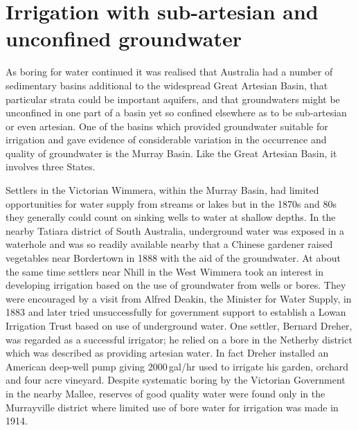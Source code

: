 \section*{Irrigation with sub-artesian and unconfined groundwater}

As boring for water continued it was realised that Australia had a
number of sedimentary basins additional to the widespread Great
Artesian Basin, that particular strata could be important aquifers,
and that groundwaters might be unconfined in one part of a basin yet
so confined elsewhere as to be sub-artesian or even artesian.  One of
the basins which provided groundwater suitable for irrigation and gave
evidence of considerable variation in the occurrence and quality of
groundwater is the Murray Basin.  Like the Great Artesian Basin, it
involves three States.

Settlers in the Victorian Wimmera, within the Murray Basin, had
limited opportunities for water supply from streams or lakes but in
the 1870s and 80s they generally could count on sinking wells to water
at shallow depths.  In the nearby Tatiara district of South Australia,
underground water was exposed in a waterhole and was so readily
available nearby that a Chinese gardener raised vegetables near
Bordertown in 1888 with the aid of the groundwater. At about the same time settlers near Nhill in the West
Wimmera took an interest in developing irrigation based on the use of
groundwater from wells or bores.  They were encouraged by a visit from
Alfred Deakin, the Minister for Water Supply, in 1883 and later tried
unsuccessfully for government support to establish a Lowan Irrigation
Trust based on use of underground water.  One settler, Bernard Dreher, was regarded as a
successful irrigator; he relied on a bore in the Netherby district
which was described as providing artesian water.  In fact Dreher
installed an American deep-well pump giving 2000\,gal/hr used to
irrigate his garden, orchard and four acre vineyard.  Despite systematic boring by the Victorian Government
in the nearby Mallee, reserves of good quality water were found only
in the Murrayville district where limited use of bore water for
irrigation was made in 1914.

